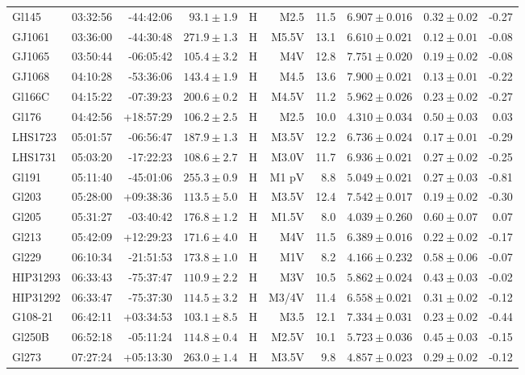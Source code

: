 \documentclass[structabstract]{aa}
\begin{document}
\begin{center}
\begin{longtable}{ l r r r r r r r r r}
Gl145 & 03:32:56 & -44:42:06 & $93.1\pm 1.9$ & H & M2.5 & 11.5 & $6.907\pm0.016$ & $0.32\pm0.02$ & -0.27 \\
GJ1061 & 03:36:00 & -44:30:48 & $271.9\pm 1.3$ & H & M5.5V & 13.1 & $6.610\pm0.021$ & $0.12\pm0.01$ & -0.08 \\
GJ1065 & 03:50:44 & -06:05:42 & $105.4\pm 3.2$ & H & M4V & 12.8 & $7.751\pm0.020$ & $0.19\pm0.02$ & -0.08 \\
GJ1068 & 04:10:28 & -53:36:06 & $143.4\pm 1.9$ & H & M4.5 & 13.6 & $7.900\pm0.021$ & $0.13\pm0.01$ & -0.22 \\
Gl166C & 04:15:22 & -07:39:23 & $200.6\pm 0.2$ & H & M4.5V & 11.2 & $5.962\pm0.026$ & $0.23\pm0.02$ & -0.27 \\
Gl176 & 04:42:56 & +18:57:29 & $106.2\pm 2.5$ & H & M2.5 & 10.0 & $4.310\pm0.034$ & $0.50\pm0.03$ & 0.03 \\
LHS1723 & 05:01:57 & -06:56:47 & $187.9\pm 1.3$ & H & M3.5V & 12.2 & $6.736\pm0.024$ & $0.17\pm0.01$ & -0.29 \\
LHS1731 & 05:03:20 & -17:22:23 & $108.6\pm 2.7$ & H & M3.0V & 11.7 & $6.936\pm0.021$ & $0.27\pm0.02$ & -0.25 \\
Gl191 & 05:11:40 & -45:01:06 & $255.3\pm 0.9$ & H & M1 pV &  8.8 & $5.049\pm0.021$ & $0.27\pm0.03$ & -0.81 \\
Gl203 & 05:28:00 & +09:38:36 & $113.5\pm 5.0$ & H & M3.5V & 12.4 & $7.542\pm0.017$ & $0.19\pm0.02$ & -0.30 \\
Gl205 & 05:31:27 & -03:40:42 & $176.8\pm 1.2$ & H & M1.5V &  8.0 & $4.039\pm0.260$ & $0.60\pm0.07$ & 0.07 \\
Gl213 & 05:42:09 & +12:29:23 & $171.6\pm 4.0$ & H & M4V & 11.5 & $6.389\pm0.016$ & $0.22\pm0.02$ & -0.17 \\
Gl229 & 06:10:34 & -21:51:53 & $173.8\pm 1.0$ & H & M1V &  8.2 & $4.166\pm0.232$ & $0.58\pm0.06$ & -0.07 \\
HIP31293 & 06:33:43 & -75:37:47 & $110.9\pm 2.2$ & H & M3V & 10.5 & $5.862\pm0.024$ & $0.43\pm0.03$ & -0.02 \\
HIP31292 & 06:33:47 & -75:37:30 & $114.5\pm 3.2$ & H & M3/4V & 11.4 & $6.558\pm0.021$ & $0.31\pm0.02$ & -0.12 \\
G108-21 & 06:42:11 & +03:34:53 & $103.1\pm 8.5$ & H & M3.5 & 12.1 & $7.334\pm0.031$ & $0.23\pm0.02$ & -0.44 \\
Gl250B & 06:52:18 & -05:11:24 & $114.8\pm 0.4$ & H & M2.5V & 10.1 & $5.723\pm0.036$ & $0.45\pm0.03$ & -0.15 \\
Gl273 & 07:27:24 & +05:13:30 & $263.0\pm 1.4$ & H & M3.5V &  9.8 & $4.857\pm0.023$ & $0.29\pm0.02$ & -0.12 \\

\end{longtable}
\end{center}
\end{document}
